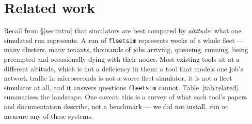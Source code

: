 \section{Related work}
\label{sec:related}

Recall from \S\ref{sec:intro} that simulators are best compared by
\emph{altitude}: what one simulated run
represents. A run of \texttt{fleetsim} represents weeks of a whole fleet ---
many clusters, many tenants, thousands of jobs arriving, queueing, running,
being preempted and occasionally dying with their nodes. Most existing tools sit
at a different altitude, which is not a deficiency in them: a tool that models
one job's network traffic in microseconds is not a worse fleet simulator, it is
not a fleet simulator at all, and it answers questions \texttt{fleetsim} cannot.
Table~\ref{tab:related} summarises the landscape. One caveat: this is a survey of
what each tool's papers and documentation describe, not a benchmark --- we did
not install, run or measure any of these systems.

